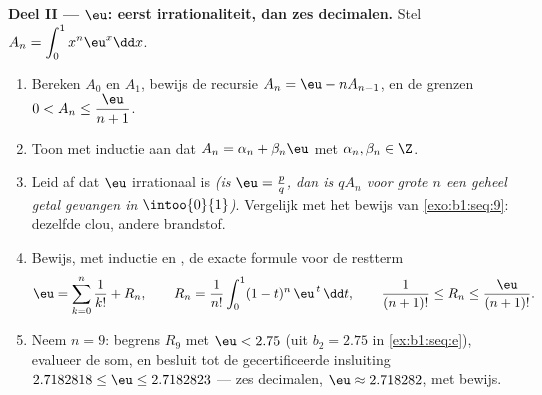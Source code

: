 \begin{problem}
\medskip
\noindent\textbf{Deel II --- $\eu$: eerst irrationaliteit, dan
zes decimalen.} Stel $A_n = \displaystyle\int_0^1 x^n \eu^x \dd x$.
\begin{enumerate}[resume]
  \item Bereken $A_0$ en $A_1$, bewijs de recursie $A_n = \eu - n
        A_{n-1}$, en de grenzen $0 < A_n \leq \dfrac{\eu}{n+1}$.
  \item Toon met inductie aan dat $A_n = \alpha_n + \beta_n \eu$
        met $\alpha_n, \beta_n \in \Z$.
  \item Leid af dat $\eu$ irrationaal is \emph{(is $\eu = \frac
        pq$, dan is $q A_n$ voor grote $n$ een geheel getal
        gevangen in $\intoo{0}{1}$)}. Vergelijk met het bewijs van
        \cref{exo:b1:seq:9}: dezelfde clou, andere brandstof.
  \item Bewijs, met inductie en , de exacte
        formule voor de restterm
        \[
        \eu = \sum_{k=0}^{n} \frac{1}{k!} + R_n,
        \qquad
        R_n = \frac{1}{n!}\int_0^1 (1 - t)^n\,\eu^{\,t}\,\dd t,
        \qquad
        \frac{1}{(n+1)!} \leq R_n \leq \frac{\eu}{(n+1)!} .
        \]
  \item Neem $n = 9$: begrens $R_9$ met $\eu < 2.75$ (uit $b_2 =
        2.75$ in \cref{ex:b1:seq:e}), evalueer de som, en besluit
        tot de gecertificeerde insluiting $2.7182818 \leq \eu \leq
        2.7182823$ --- zes decimalen, $\eu \approx 2.718282$, met
        bewijs.
\end{enumerate}


\end{problem}
